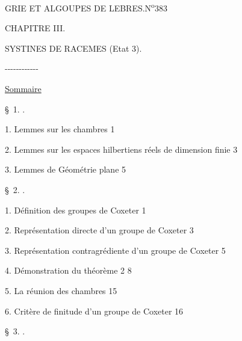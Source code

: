\hfill{}


\begin{center}GRIE ET ALGOUPES DE LEBRES.\hfill N\textsuperscript{o}383\end{center}

\begin{center}CHAPITRE III.\end{center}

\begin{center}SYSTINES DE RACEMES (Etat 3).\end{center}

\begin{center}\mbox{-{}-{}-{}-{}-{}-{}-{}-{}-{}-{}-{}-}\end{center}

\begin{center}\uline{Sommaire}\end{center}

\begin{center}\S~1. .\end{center}

1. Lemmes sur les chambres \dotfill{} 1

2. Lemmes sur les espaces hilbertiens réels de dimension finie \dotfill{} 3

3. Lemmes de Géométrie plane \dotfill{} 5

\begin{center}\S~2. .\end{center}

1. Définition des groupes de Coxeter \dotfill{} 1

2. Représentation directe d’un groupe de Coxeter \dotfill{} 3

3. Représentation contragrédiente d’un groupe de Coxeter \dotfill{} 5

4. Démonstration du théorème 2 \dotfill{} 8

5. La réunion des chambres \dotfill{} 15

6. Critère de finitude d’un groupe de Coxeter \dotfill{} 16

\begin{center}\S~3. .\end{center}

